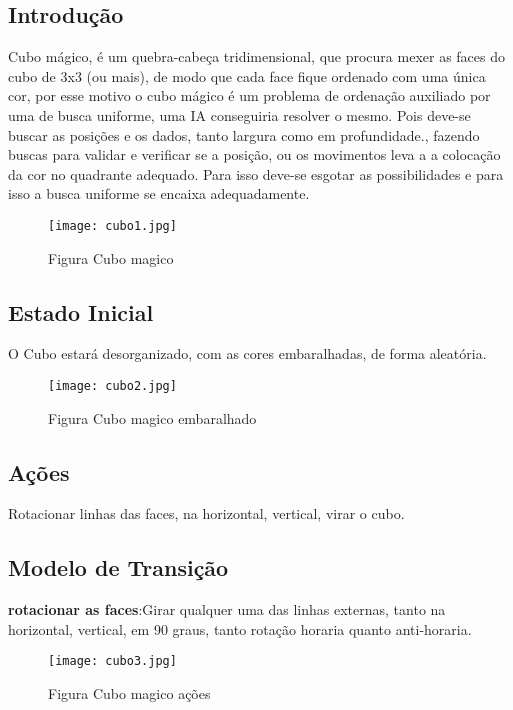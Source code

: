 \documentclass[12pt,a4paper,twocolumn]{article}
\begin{document}
\subsection{Introdução}
Cubo mágico, é um quebra-cabeça tridimensional, que procura mexer as faces do cubo de 3x3 (ou mais), de modo que cada face fique ordenado com uma única cor, por esse motivo o cubo mágico é um problema de ordenação auxiliado por uma de busca uniforme, uma IA conseguiria resolver o mesmo. Pois
deve-se buscar as posições e os dados, tanto largura como em profundidade., fazendo buscas para validar e verificar se a posição, ou os movimentos leva a 
a colocação da cor no quadrante adequado. Para isso deve-se esgotar as possibilidades e para isso a busca uniforme se encaixa adequadamente.


\begin{figure}[h]
   \centering
   \texttt{[image: cubo1.jpg]}
   \caption{Figura Cubo magico}
   \label{fig:cubo1} 
\end{figure}
	
\subsection{Estado Inicial}
O Cubo estará desorganizado, com as cores embaralhadas, de forma aleatória.

\begin{figure}[h]
   \centering
   \texttt{[image: cubo2.jpg]}
   \caption{Figura Cubo magico embaralhado}
   \label{fig:cubo2} 
\end{figure}

\subsection{Ações}
Rotacionar linhas das faces, na horizontal, vertical, virar o cubo.
\subsection{Modelo de Transição}
  \textbf{rotacionar as faces}:Girar qualquer uma das linhas externas, tanto na horizontal, vertical, em 90 graus, tanto rotação horaria quanto anti-horaria.



\begin{figure}[h]
   \centering
   \texttt{[image: cubo3.jpg]}
   \caption{Figura Cubo magico ações}
   \label{fig:cubo3} 
\end{figure}
\end{document}
